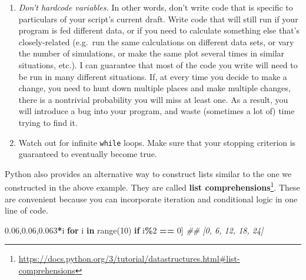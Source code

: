 \documentclass[
  12pt,
  krantz2]{krantz}
\makeatletter
\newenvironment{Shaded}{\begin{snugshade}}{\end{snugshade}}
\newcommand{\BuiltInTok}[1]{#1}
\newcommand{\CommentTok}[1]{\textcolor[rgb]{0.37,0.37,0.37}{\textit{#1}}}
\newcommand{\ControlFlowTok}[1]{\textcolor[rgb]{0.27,0.27,0.27}{\textbf{#1}}}
\newcommand{\DecValTok}[1]{\textcolor[rgb]{0.06,0.06,0.06}{#1}}
\newcommand{\KeywordTok}[1]{\textcolor[rgb]{0.27,0.27,0.27}{\textbf{#1}}}
\newcommand{\NormalTok}[1]{#1}
\newcommand{\OperatorTok}[1]{\textcolor[rgb]{0.43,0.43,0.43}{\textbf{#1}}}
\providecommand{\tightlist}{%
  \setlength{\itemsep}{0pt}\setlength{\parskip}{0pt}}
\renewcommand{\href}[2]{#2\footnote{\url{#1}}}
\newenvironment{kframe}{%
\medskip{}
\setlength{\fboxsep}{.8em}
 \def\at@end@of@kframe{}%
 \ifinner\ifhmode%
  \def\at@end@of@kframe{\end{minipage}}%
  \begin{minipage}{\columnwidth}%
 \fi\fi%
 \def\FrameCommand##1{\hskip\@totalleftmargin \hskip-\fboxsep
 \colorbox{shadecolor}{##1}\hskip-\fboxsep
     \hskip-\linewidth \hskip-\@totalleftmargin \hskip\columnwidth}%
 \MakeFramed {\advance\hsize-\width
   \@totalleftmargin\z@ \linewidth\hsize
   \@setminipage}}%
 {\par\unskip\endMakeFramed%
 \at@end@of@kframe}
\renewenvironment{Shaded}{\begin{kframe}}{\end{kframe}}
\newenvironment{rmd-caution}{\begin{lrbox}{\rmdbox}
  \minipage[c]{\dimexpr \textwidth-2\fboxrule-\wd\excl-\columnsep}
    \vspace*{\columnsep}}%
{\vspace*{\columnsep}\endminipage\end{lrbox}%
  {\par\color{yellow}\fboxsep=0pt
    \fbox{\usebox\excl\usebox\rmdbox\hspace{\columnsep}}\par}}
\makeatother
\begin{document}
\begin{rmd-caution}
\begin{enumerate}
  \begin{itemize}
  \tightlist
  \item
    Python starts counting from \(0\), while R starts counting from \(1\)
  \item
    sometimes iteration \texttt{i} references the \texttt{i-1}th element of a container
  \item
    The behavior of loops is sometimes more difficult to understand if they're using \href{https://cran.r-project.org/doc/manuals/r-release/R-lang.html\#Looping}{\texttt{break}} or \href{https://docs.python.org/3/tutorial/controlflow.html\#break-and-continue-statements-and-else-clauses-on-loops}{\texttt{continue}/\texttt{next} statements}.
  \end{itemize}
\item
  \emph{Don't hardcode variables.} In other words, don't write code that is specific to particulars of your script's current draft. Write code that will still run if your program is fed different data, or if you need to calculate something else that's closely-related (e.g.~run the same calculations on different data sets, or vary the number of simulations, or make the same plot several times in similar situations, etc.). I can guarantee that most of the code you write will need to be run in many different situations. If, at every time you decide to make a change, you need to hunt down multiple places and make multiple changes, there is a nontrivial probability you will miss at least one. As a result, you will introduce a bug into your program, and waste (sometimes a lot of) time trying to find it.
\item
  Watch out for infinite \texttt{while} loops. Make sure that your stopping criterion is guaranteed to eventually become true.
\end{enumerate}

\end{rmd-caution}

Python also provides an alternative way to construct lists similar to the one we constructed in the above example. They are called \href{https://docs.python.org/3/tutorial/datastructures.html\#list-comprehensions}{\textbf{list comprehensions}}. These are convenient because you can incorporate iteration and conditional logic in one line of code.

\begin{Shaded}
\begin{Highlighting}[]
\NormalTok{[}\DecValTok{3}\OperatorTok{*}\NormalTok{i }\ControlFlowTok{for}\NormalTok{ i }\KeywordTok{in} \BuiltInTok{range}\NormalTok{(}\DecValTok{10}\NormalTok{) }\ControlFlowTok{if}\NormalTok{ i}\OperatorTok{\%}\DecValTok{2} \OperatorTok{==} \DecValTok{0}\NormalTok{]}
\CommentTok{\#\# [0, 6, 12, 18, 24]}
\end{Highlighting}
\end{Shaded}
\end{document}

